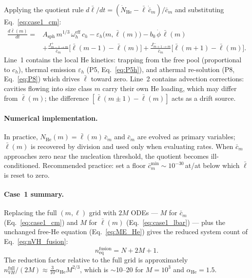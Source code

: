 \documentclass[pdflatex,sn-basic]{sn-jnl} %
\begin{document}
Applying the quotient rule
$d\bar{\ell}/dt = (\dot{N}_{\mathrm{He}} - \bar{\ell}\,\dot{\bar{c}}_m)
/ \bar{c}_m$ and substituting Eq.~\eqref{eq:case1_cm}:
\begin{equation}\label{eq:case1_lbar}
\boxed{
\begin{split}
    \frac{d\bar{\ell}(m)}{dt} = {} &
      A_{\mathrm{sph}}\,m^{1/3}\,\omega_h^{\mathrm{eff}}\,c_h
    - \varepsilon_h\bigl(m,\bar{\ell}(m)\bigr)
    - b_0\,\dot{\phi}\,\bar{\ell}(m)
    \\[3pt]
    &+ \frac{J_{m-1 \to m}^{+}}{\bar{c}_m}
       \bigl[\bar{\ell}(m{-}1) - \bar{\ell}(m)\bigr]
     + \frac{J_{m+1 \to m}^{-}}{\bar{c}_m}
       \bigl[\bar{\ell}(m{+}1) - \bar{\ell}(m)\bigr].
\end{split}
}
\end{equation}
Line~1 contains the local He kinetics: trapping from the free pool
(proportional to $c_h$), thermal emission $\varepsilon_h$ (P5,
Eq.~\ref{eq:P5h}), and athermal re-solution (P8, Eq.~\ref{eq:P8})
which drives $\bar{\ell}$ toward zero. Line~2 contains advection
corrections: cavities flowing into size class $m$ carry their own He
loading, which may differ from $\bar{\ell}(m)$; the difference
$[\bar{\ell}(m\pm 1) - \bar{\ell}(m)]$ acts as a drift source.

\paragraph{Numerical implementation.}
In practice, $N_{\mathrm{He}}(m) = \bar{\ell}(m)\,\bar{c}_m$ and
$\bar{c}_m$ are evolved as primary variables; $\bar{\ell}(m)$ is
recovered by division and used only when evaluating rates. When
$\bar{c}_m$ approaches zero near the nucleation threshold, the quotient
becomes ill-conditioned. Recommended practice: set a floor
$\bar{c}_m^{\min} \sim 10^{-30}$\,at/at below which $\bar{\ell}$ is
reset to zero.

\paragraph{Case~1 summary.}
Replacing the full $(m,\ell)$ grid with $2M$ ODEs --- $M$ for
$\bar{c}_m$ (Eq.~\ref{eq:case1_cm}) and $M$ for $\bar{\ell}(m)$
(Eq.~\ref{eq:case1_lbar}) --- plus the unchanged free-He equation
(Eq.~\ref{eq:ME_He}) gives the reduced system count of
Eq.~\eqref{eq:nVH_fusion}:
\begin{equation*}
    n_{\mathrm{eq}}^{\mathrm{fusion}} = N + 2M + 1.
\end{equation*}
The reduction factor relative to the full grid is approximately
$n_{VH}^{\mathrm{full}} / (2M) \approx \tfrac{3}{10}\alpha_{\mathrm{He}}
M^{2/3}$, which is $\sim$10--20 for $M = 10^3$ and
$\alpha_{\mathrm{He}} = 1.5$.
\end{document}
